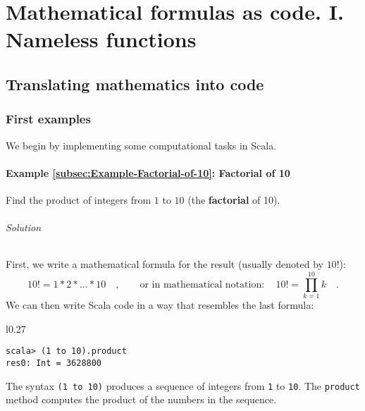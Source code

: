 
\chapter{Mathematical formulas as code. I. Nameless functions\label{chap:1-Values,-types,-expressions,}}

\section{Translating mathematics into code}

\subsection{First examples}

We begin by implementing some computational tasks in Scala.

\subsubsection{Example \label{subsec:Example-Factorial-of-10}\ref{subsec:Example-Factorial-of-10}:
Factorial of 10}

Find the product of integers from $1$ to $10$ (the \textbf{factorial}
of 10).

\subparagraph{Solution}

First, we write a mathematical formula for the result (usually denoted
by $10!$):
\[
10!=1*2*...*10\quad,\quad\quad\text{or in mathematical notation}:\quad10!=\prod_{k=1}^{10}k\quad.
\]
We can then write Scala code in a way that resembles the last formula:

\begin{wrapfigure}{l}{0.27\columnwidth}%
\vspace{-0.8\baselineskip}
\begin{lstlisting}
scala> (1 to 10).product
res0: Int = 3628800
\end{lstlisting}

\vspace{-0.8\baselineskip}
\end{wrapfigure}%

\noindent The syntax \lstinline!(1 to 10)! produces a sequence of
integers from \lstinline!1! to \lstinline!10!. The \lstinline!product!
method computes the product of the numbers in the sequence.

